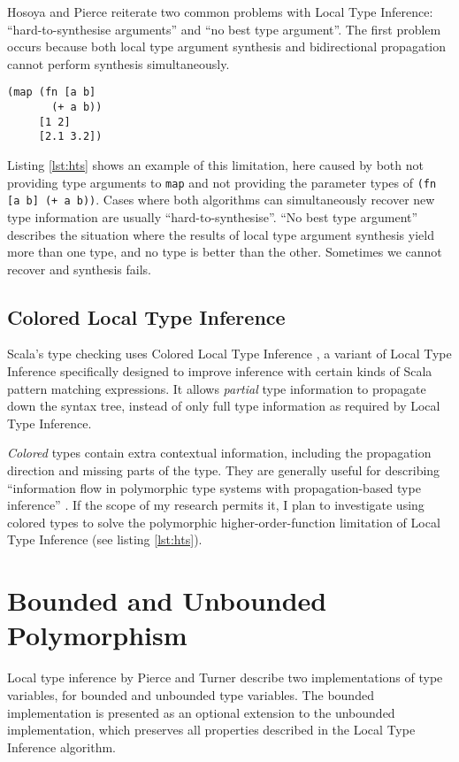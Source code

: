 Hosoya and Pierce \cite{HP99} reiterate two common problems with Local Type Inference:
``hard-to-synthesise arguments'' and ``no best type argument''. The first problem occurs because
both local type argument synthesis and bidirectional propagation cannot perform synthesis
simultaneously. 

\begin{lstlisting}[caption=Hard-to-synthesise expression, label=lst:hts]
(map (fn [a b] 
       (+ a b)) 
     [1 2] 
     [2.1 3.2])
\end{lstlisting}

Listing \ref{lst:hts} shows an example of this limitation,
here caused by both not providing type arguments to \lstinline|map| and not providing the parameter types of \lstinline|(fn [a b] (+ a b))|.
 Cases where both algorithms can simultaneously recover new type information are usually ``hard-to-synthesise''.
``No best type argument'' describes the situation where the results of local
type argument synthesis yield more than one type, and no type is better than the other. Sometimes we cannot recover and synthesis
fails.

\subsection{Colored Local Type Inference}

Scala's type checking uses Colored Local Type Inference \cite{OZZ01},
a variant of Local Type Inference \cite{PT00} specifically designed to
improve inference with certain kinds of Scala pattern matching expressions. It allows
\emph{partial} type information to propagate down the syntax tree, instead of only full type information
as required by Local Type Inference.

\emph{Colored} types contain extra contextual information, including the propagation direction
and missing parts of the type. They are generally useful
for describing ``information flow in polymorphic type systems with propagation-based type inference''
\cite{OZZ01}. If the scope of my research permits it, I plan to investigate
using colored types to solve the polymorphic higher-order-function limitation of Local Type Inference
(see listing \ref{lst:hts}).

\section{Bounded and Unbounded Polymorphism}

Local type inference by Pierce and Turner\cite{PT00}
describe two implementations of type variables, for bounded
and unbounded type variables. The bounded implementation is presented
as an optional extension  to the unbounded implementation, which preserves all
properties described in the Local Type Inference algorithm.

